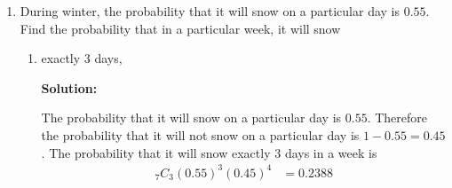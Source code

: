 \documentclass{report}
\newcommand{\sol}{\textbf{Solution:}}
\newcommand\permtwo[2][^n]{{}_{#1}P_{#2}}
\newcommand\comb[2][^n]{{}_{#1}C_{#2}}
\begin{document}
\begin{enumerate}[leftmargin=*]
\begin{enumerate}
\begin{enumerate}[]
                              \sol{}

                              Since $A$ and $B$ are always together, we can treat them as one entity.
                              Therefore the number of possible arrangements is $\permtwo[4]{4} \times 2! =
                                  48$.

                    \end{enumerate}
                    \newpage
              \item A class monitor wants to divide 10 students into three groups such that the
                    groups consist of 2 members, 3 members and 5 members. Find the number of
                    different ways to divide all the students.

                    \sol{}

                    First, choose 2 students from 10, we have $\comb[10]{2}$. Then choose 3
                    students from remaining 8, we have $\comb[8]{3}$. The remaining 5 students form
                    the last group. Therefore the number of different ways to divide all the
                    students is
                    \begin{align*}
                        \comb[10]{2} \times \comb[8]{3} & = 45 \times 56 \\
                                                        & = 2520
                    \end{align*}
          \end{enumerate}

    \item During winter, the probability that it will snow on a particular day is $0.55$.
          Find the probability that in a particular week, it will snow
          \begin{enumerate}
              \item exactly 3 days,

                    \sol{}

                    The probability that it will snow on a particular day is $0.55$. Therefore the
                    probability that it will not snow on a particular day is $1 - 0.55 = 0.45$. The
                    probability that it will snow exactly 3 days in a week is
                    \begin{align*}
                        \comb[7]{3} (0.55)^3 (0.45)^4 & = 0.2388
                    \end{align*}


\end{enumerate}
\end{enumerate}
\end{document}
